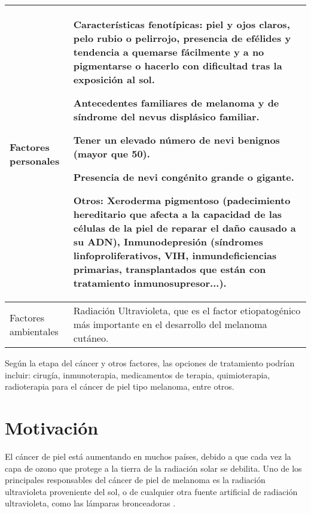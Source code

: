 \begin{table}[htb]
\centering
\begin{tabular}{*{2}{p{.425\linewidth}}}
\midrule
Factores personales & 
Características fenotípicas: piel y ojos claros, pelo rubio o pelirrojo, presencia de efélides y tendencia a quemarse fácilmente y a no pigmentarse o hacerlo con dificultad tras la exposición al sol.

Antecedentes familiares de melanoma y de síndrome del nevus displásico familiar.

Tener un elevado número de nevi benignos (mayor que 50).

Presencia de nevi congénito grande o gigante.

Otros: Xeroderma pigmentoso (padecimiento hereditario que afecta a la capacidad de las células de la piel de reparar el daño causado a su ADN), Inmunodepresión (síndromes linfoproliferativos, VIH, inmundeficiencias primarias, transplantados que están con tratamiento inmunosupresor...).\\

\midrule %

Factores ambientales & 
Radiación Ultravioleta, que es el factor etiopatogénico más importante en el desarrollo del melanoma cutáneo. \\
\bottomrule
\end{tabular}
\end{table}

Según la etapa del cáncer y otros factores, las opciones de tratamiento podrían incluir: cirugía, inmunoterapia, medicamentos de terapia, quimioterapia, radioterapia para el cáncer de piel tipo melanoma, entre otros.

\newpage
\section{Motivación} 
El cáncer de piel está aumentando en muchos países, debido a que cada vez la capa de ozono que protege a la tierra de la radiación solar se debilita. Uno de los principales responsables del cáncer de piel de melanoma es la radiación ultravioleta proveniente del sol, o de cualquier otra fuente artificial de radiación ultravioleta, como las lámparas bronceadoras \cite{uvi}.

